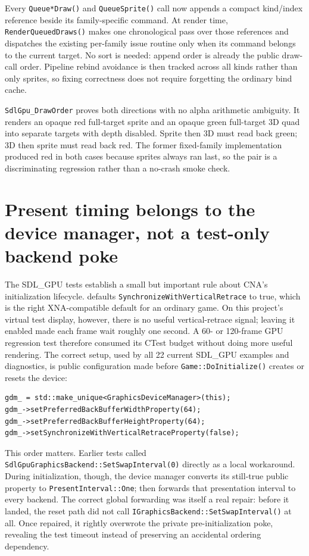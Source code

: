 Every \texttt{Queue*Draw()} and \texttt{QueueSprite()} call now appends a compact kind/index
reference beside its family-specific command. At render time,
\texttt{RenderQueuedDraws()} makes one chronological pass over those references and dispatches
the existing per-family issue routine only when its command belongs to the current target. No
sort is needed: append order is already the public draw-call order. Pipeline rebind avoidance is
then tracked across all kinds rather than only sprites, so fixing correctness does not require
forgetting the ordinary bind cache.

\texttt{SdlGpu\_DrawOrder} proves both directions with no alpha arithmetic ambiguity. It renders
an opaque red full-target sprite and an opaque green full-target 3D quad into separate targets
with depth disabled. Sprite then 3D must read back green; 3D then sprite must read back red.
The former fixed-family implementation produced red in both cases because sprites always ran
last, so the pair is a discriminating regression rather than a no-crash smoke check.

\section{Present timing belongs to the device manager, not a test-only backend poke}

The SDL\_GPU tests establish a small but important rule about CNA's initialization lifecycle.
 defaults \texttt{SynchronizeWithVerticalRetrace} to true,
which is the right XNA-compatible default for an ordinary game. On this project's virtual test
display, however, there is no useful vertical-retrace signal; leaving it enabled made each frame
wait roughly one second. A 60- or 120-frame GPU regression test therefore consumed its CTest
budget without doing more useful rendering. The correct setup, used by all 22 current
SDL\_GPU examples and diagnostics, is public configuration made before
\texttt{Game::DoInitialize()} creates or resets the device:

\begin{lstlisting}
gdm_ = std::make_unique<GraphicsDeviceManager>(this);
gdm_->setPreferredBackBufferWidthProperty(64);
gdm_->setPreferredBackBufferHeightProperty(64);
gdm_->setSynchronizeWithVerticalRetraceProperty(false);
\end{lstlisting}

This order matters. Earlier tests called \texttt{SdlGpuGraphicsBackend::SetSwapInterval(0)}
directly as a local workaround. During initialization, though, the device manager converts its
still-true public property to \texttt{PresentInterval::One}; 
then forwards that presentation interval to every backend. The correct global forwarding was
itself a real repair: before it landed, the reset path did not call
\texttt{IGraphicsBackend::SetSwapInterval()} at all. Once repaired, it rightly overwrote the
private pre-initialization poke, revealing the test timeout instead of preserving an accidental
ordering dependency.

